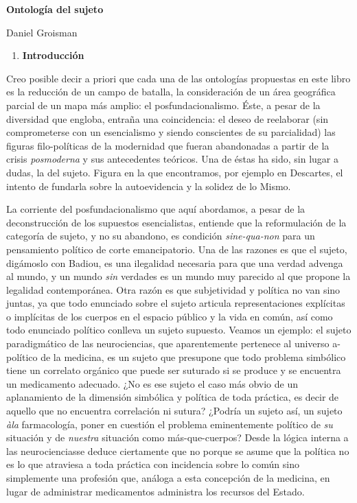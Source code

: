 \documentclass{book}
\begin{document}
\textbf{Ontología del sujeto}

Daniel Groisman

\hl{}

\begin{enumerate}
\def\labelenumi{\arabic{enumi}.}
\item
  \textbf{Introducción}
\end{enumerate}

Creo posible decir a priori que cada una de las ontologías propuestas en
este libro es la reducción de un campo de batalla, la consideración de
un área geográfica parcial de un mapa más amplio: el posfundacionalismo.
Éste, a pesar de la diversidad que engloba, entraña una coincidencia: el
deseo de reelaborar (sin comprometerse con un esencialismo y siendo
conscientes de su parcialidad) las figuras filo-políticas de la
modernidad que fueran abandonadas a partir de la crisis
\emph{posmoderna} y sus antecedentes teóricos. Una de éstas ha sido, sin
lugar a dudas, la del sujeto. Figura en la que encontramos, por ejemplo
en Descartes, el intento de fundarla sobre la autoevidencia y la solidez
de lo Mismo.

La corriente del posfundacionalismo que aquí abordamos, a pesar de la
deconstrucción de los supuestos esencialistas, entiende que la
reformulación de la categoría de sujeto, y no su abandono, es condición
\emph{sine-qua-non} para un pensamiento político de corte emancipatorio.
Una de las razones es que el sujeto, digámoslo con Badiou, es una
ilegalidad necesaria para que una verdad advenga al mundo, y un mundo
\emph{sin} verdades es un mundo muy parecido al que propone la legalidad
contemporánea. Otra razón es que subjetividad y política no van sino
juntas, ya que todo enunciado sobre el sujeto articula representaciones
explícitas o implícitas de los cuerpos en el espacio público y la vida
en común, así como todo enunciado político conlleva un sujeto supuesto.
Veamos un ejemplo: el sujeto paradigmático de las neurociencias, que
aparentemente pertenece al universo a-político de la medicina, es un
sujeto que presupone que todo problema simbólico tiene un correlato
orgánico que puede ser suturado si se produce y se encuentra un
medicamento adecuado. ¿No es ese sujeto el caso más obvio de un
aplanamiento de la dimensión simbólica y política de toda práctica, es
decir de aquello que no encuentra correlación ni sutura? ¿Podría un
sujeto así, un sujeto \emph{àla} farmacología, poner en cuestión el
problema eminentemente político de \emph{su} situación y de
\emph{nuestra} situación como más-que-cuerpos? Desde la lógica interna a
las neurocienciasse deduce ciertamente que no porque se asume que la
política no es lo que atraviesa a toda práctica con incidencia sobre lo
común sino simplemente una profesión que, análoga a esta concepción de
la medicina, en lugar de administrar medicamentos administra los
recursos del Estado.
\end{document}
